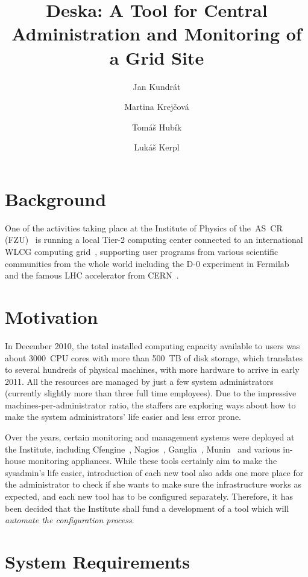 \documentclass{article}
\begin{document}
\title{Deska: A Tool for Central Administration and Monitoring of a Grid Site}

\author{Jan Kundrát \and Martina Krejčová \and Tomáš Hubík \and Lukáš Kerpl}

\maketitle

\section{Background}

One of the activities taking place at the Institute of Physics of the~AS~CR (FZU)~\cite{fzu} is running a local Tier-2 computing
center connected to an international WLCG computing grid~\cite{wlcg}, supporting user programs from various scientific communities
from the whole world including the D-0 experiment in Fermilab~\cite{d0} and the famous LHC accelerator from CERN~\cite{lhc}.

\section{Motivation}

In December 2010, the total installed computing capacity available to users was about 3000~CPU cores with more than 500~TB of disk
storage, which translates to several hundreds of physical machines, with more hardware to arrive in early 2011.  All the resources
are managed by just a few system administrators (currently slightly more than three full time employees).  Due to the impressive
machines-per-administrator ratio, the staffers are exploring ways about how to make the system administrators' life easier and
less error prone.

Over the years, certain monitoring and management systems were deployed at the Institute, including Cfengine~\cite{cfengine},
Nagios~\cite{nagios}, Ganglia~\cite{ganglia}, Munin~\cite{munin} and various in-house monitoring appliances.  While these tools
certainly aim to make the sysadmin's life easier, introduction of each new tool also adds one more place for the administrator to
check if she wants to make sure the infrastructure works as expected, and each new tool has to be configured separately.
Therefore, it has been decided that the Institute shall fund a development of a tool which will {\em automate the configuration
process}.

\section{System Requirements}
\end{document}
